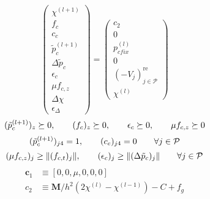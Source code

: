 \documentclass[a4paper,10pt]{article}
\begin{document}
\begin{equation}
{}
\begin{pmatrix}
\chi^{(l+1)} \\
f_{c} \\
c_{c} \\
\tilde{p}^{(l+1)}_{c} \\
\Delta \tilde{p}_{c} \\
\epsilon_{c} \\ \mu f_{c,z} \\
\Delta\chi \\
\epsilon_{\Delta}
\end{pmatrix}
=
\begin{pmatrix}
c_2 \\
0 \\
p_{cfix}^{(l)} \\
0 \\
(-V_{j})_{j \in \mathcal{P}}^\text{re} \\
\chi^{(l)}
\end{pmatrix}
\end{equation}
\begin{equation}\notag
(\tilde{p}^{(l+1)}_{c})_z \succeq 0       , \quad\quad
(f_c)_z \succeq 0              , \quad\quad
\epsilon_{c} \succeq 0          , \quad\quad
\mu f_{c,z} \succeq 0
\end{equation}
\begin{equation}\notag
(\tilde{p}_c^{(l+1)})_{j4} = 1 , \quad\quad
(c_c)_{j4} = 0  \quad\quad \forall j \in \mathcal{P}
\end{equation}
\begin{equation}\notag
(\mu f_{c,z})_j  \geq \| (f_{c,t})_j         \| , \quad\quad
(\epsilon_{c})_j    \geq \| (\Delta \tilde{p}_{c})_j      \| \quad\quad \forall j \in \mathcal{P}
\end{equation}
\begin{align*}
\mathbf{c}_1      & \equiv [ 0, 0, \mu, 0, 0, 0 ]\\
c_2               & \equiv \mathbf{M}/h^2(2\chi^{(l)}-\chi^{(l-1)}) - C + f_g
\end{align*}

\pagebreak

\newcommand{\eyemuscle}{\ensuremath{
\begin{bmatrix}
\mathbf{0} & -\mathbf{1}
\end{bmatrix}
}}
\end{document}
